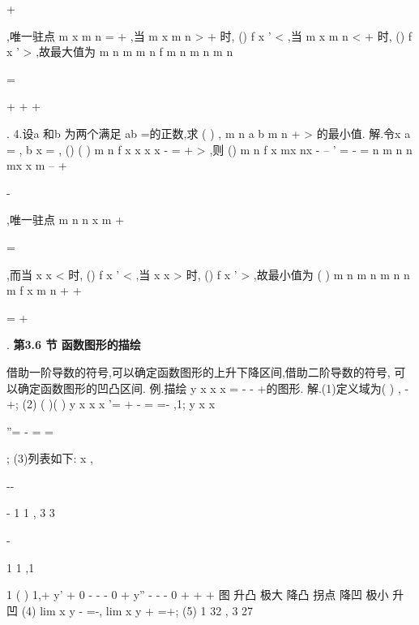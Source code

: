+


,唯一驻点 
m
x
m
n
=
+
,当
m
x
m
n
>
+
时,
()
f
x
'
<
,当
m
x
m
n
<
+
时,
()
f
x
'
>
,故最大值为 
m
n
m
m
n
f
m
n
m
n
m
n





=





+
+
+





. 
4.设a 和b 为两个满足
ab =的正数,求
(
)
,
m
n
a
b
m n
+
>
的最小值. 
解.令x
a
=
,
b
x
=
,
()
(
)
m
n
f x
x
x
x
-
=
+
>
,则
()
m
n
f
x
mx
nx
-
--
'
=
-
= 
n
m n
n
mx
x
m
--
+


-




,唯一驻点
m n
n
x
m
+


=



,而当
x
x
<
时,
()
f
x
'
<
,当
x
x
>
时, 
()
f
x
'
>
,故最小值为
(
)
m
n
m n
m n
n
m
f x
m
n
+
+




=
+








. 
\vspace{6pt}
{\large \bfseries \textcolor{lyred}{第3.6 节 函数图形的描绘}}

借助一阶导数的符号,可以确定函数图形的上升下降区间,借助二阶导数的符号, 
可以确定函数图形的凹凸区间. 
\textcolor{lyred}{例}.描绘
y
x
x
x
=
-
-
+的图形. 
解.(1)定义域为(
)
,
-\infty +\infty ; 
(2)
(
)(
)
y
x
x
x
'=
+
-
=
\Rightarrow 
=-
,1;
y
x
x


''=
-
=
\Rightarrow 
=




; 
(3)列表如下: 
x    
,


-\infty -




-
1 1
,
3 3


-




1     1 ,1






      1    (
)
1,+\infty  
y'       +        0        -       -       -        0     + 
y''       -        -        -       0       +       +     + 
图      升凸      极大      降凸    拐点     降凹     极小   升凹 
(4) lim
x
y
\to -\infty 
=-\infty , lim
x
y
\to +\infty 
=+\infty ; 
(5)
1 32
,
3 27



